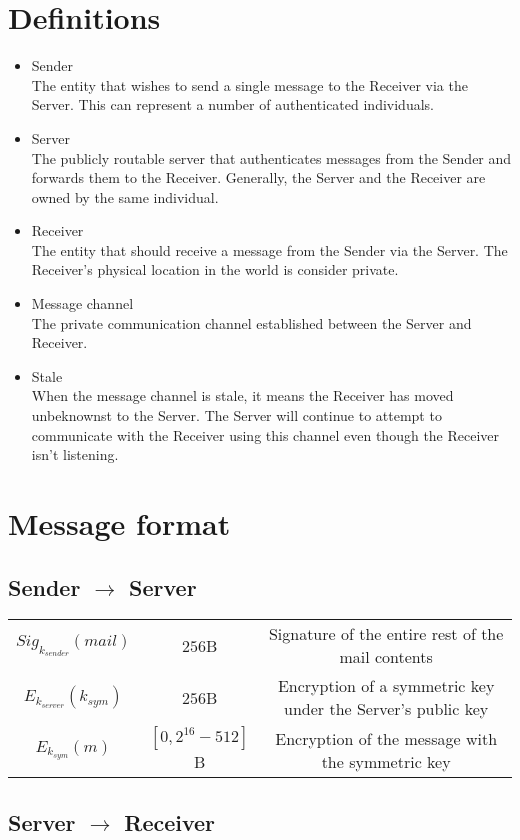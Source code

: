 \documentclass[11pt]{article}
\begin{document}
\section*{Definitions}
\begin{itemize}
\item Sender \\
The entity that wishes to send a single message to the Receiver via the Server.
This can represent a number of authenticated individuals.
\item Server \\
The publicly routable server that authenticates messages from the Sender and
forwards them to the Receiver. Generally, the Server and the Receiver are
owned by the same individual.
\item Receiver \\
The entity that should receive a message from the Sender via the Server. The
Receiver's physical location in the world is consider private.
\item Message channel \\
The private communication channel established between the Server and Receiver.
\item Stale \\
When the message channel is stale, it means the Receiver has moved unbeknownst
to the Server. The Server will continue to attempt to communicate with the
Receiver using this channel even though the Receiver isn't listening.
\end{itemize}
\pagebreak

\section*{Message format}
\subsection*{Sender $\rightarrow$ Server}
\begin{tabular}{c c c}
  $Sig_{k_{sender}}\left(mail\right)$ & $256$B &
    Signature of the entire rest of the mail contents\\
  $E_{k_{server}}\left(k_{sym}\right)$ & $256$B &
    Encryption of a symmetric key under the Server's public key\\
  $E_{k_{sym}}\left(m\right)$ & $\left[0, 2^{16} - 512 \right]$B &
    Encryption of the message with the symmetric key

\end{tabular}

\subsection*{Server $\rightarrow$ Receiver}
\end{document}
